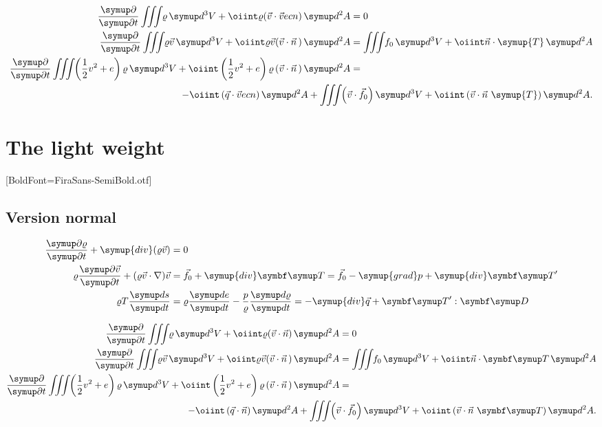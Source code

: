 \documentclass[english,log-declarations=false]{article}
\begin{document}
\setBold
\begin{align}
 \Q{}{t}\iiint\<\varrho\diff^3V+\oiint\varrho(\vec{v}\cdot\vec{v}ec{n})\diff^2A          &= 0\\
 \Q{}{t}\iiint\<\varrho\vec{v}\diff^3V+\oiint\varrho\vec{v}(\vec{v}\cdot\vec{n}\,)\diff^2A &=
        \iiint\<f_0\diff^3V+\oiint\vec{n}\cdot\symup{T}\diff^2A \\
 \Q{}{t}\iiint\<\left(\half v^2+e\right)\varrho\diff^3V+\oiint\left(\half v^2+e\right)
        \varrho\left(\vec{v}\cdot\vec{n}\,\right)\diff^2A                                & =\\
 \multispan2{\hfill${\displaystyle-\oiint\left(\vec{q}\cdot\vec{v}ec{n}\right)\diff^2A+
         \iiint\<\left(\vec{v}\cdot\vec{f}_0\right)\diff^3V+\oiint\left(\vec{v}
         \cdot\vec{n}~\symup{T}\right)\diff^2A}$}.\nonumber
\end{align}
\unsetBold



\section{The light  weight}

\setsansfont{FiraSans-Light.otf}[BoldFont=FiraSans-SemiBold.otf]

\subsection{Version normal}

\begin{align}
\begin{aligned}
  \Q{\varrho}{t}+\symup{div}(\varrho\vec{v}) &= 0 \\
  \varrho\Q{\vec{v}}{t}+(\varrho\vec{v}\cdot\nabla)\vec{v}   &= \vec{f}_0+\symup{div}\TT=\vec{f}_0
	-\symup{grad}p+\symup{div}\TT' \\
  \varrho T\frac{\diff s}{\diff t}               &= \varrho\frac{\diff e}{\diff t}
    -\frac{p}{\varrho}\frac{\diff\varrho}{\diff t}=-\symup{div}\vec{q}+\TT':\DD 
\end{aligned}
\end{align}

\begin{align}
 \Q{}{t}\iiint\<\varrho\diff^3V+\oiint\varrho(\vec{v}\cdot\vec{n})\diff^2A          &= 0\\
 \Q{}{t}\iiint\<\varrho\vec{v}\diff^3V+\oiint\varrho\vec{v}(\vec{v}\cdot\vec{n}\,)\diff^2A &=
        \iiint\<f_0\diff^3V+\oiint\vec{n}\cdot\TT\diff^2A \\
 \Q{}{t}\iiint\<\left(\half v^2+e\right)\varrho\diff^3V+\oiint\left(\half v^2+e\right)
        \varrho\left(\vec{v}\cdot\vec{n}\,\right)\diff^2A                                & =\\
 \multispan2{\hfill${\displaystyle-\oiint\left(\vec{q}\cdot\vec{n}\right)\diff^2A+
         \iiint\<\left(\vec{v}\cdot\vec{f}_0\right)\diff^3V+\oiint\left(\vec{v}
         \cdot\vec{n}~\TT\right)\diff^2A}$}.\nonumber
\end{align}
\end{document}
